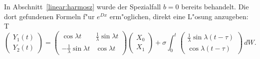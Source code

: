 In Abschnitt~\ref{linear:harmosz} wurde der Spezialfall $b=0$ bereits
behandelt.
Die dort gefundenen Formeln f"ur $e^{Dx}$ erm"oglichen, direkt eine
L"osung anzugeben:
T
\begin{equation}
\begin{pmatrix}
Y_1(t)\\Y_2(t)
\end{pmatrix}
=
\begin{pmatrix}
                \cos\lambda t&\frac1{\lambda}\sin\lambda t\\
-\frac1{\lambda}\sin\lambda t&               \cos\lambda t
\end{pmatrix}
\begin{pmatrix}X_0\\X_1\end{pmatrix}
+
\sigma\int_0^t
\begin{pmatrix}
\frac1{\lambda}\sin\lambda(t-\tau)\\
               \cos\lambda(t-\tau)
\end{pmatrix}\,dW.
\end{equation}
